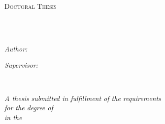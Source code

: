 \documentclass[
12pt, %
singlespacing, %
liststotoc, %
toctotoc, %
nohyperref, %
headsepline, %
]{MastersDoctoralThesis} %
\author{$for(author)$$if(author.correspond)$$author.name$$endif$$endfor$} %
\begin{document}
\frontmatter %

\pagestyle{plain} %


\begin{titlepage}
\begin{center}

\vspace*{.06\textheight}
{\scshape\LARGE \univname\par}\vspace{1.5cm} %
\textsc{\Large Doctoral Thesis}\\[0.5cm] %

\HRule \\[0.4cm] %
{\huge \bfseries \ttitle\par}\vspace{0.4cm} %
\HRule \\[1.5cm] %

\begin{minipage}[t]{0.4\textwidth}
\begin{flushleft} \large
\emph{Author:}\\
\href{$for(author)$$if(author.correspond)$$author.url$$endif$$endfor$}{\authorname} %
\end{flushleft}
\end{minipage}
\begin{minipage}[t]{0.4\textwidth}
\begin{flushright} \large
\emph{Supervisor:} \\
\href{$thesis.supervisor.url$}{\supname} %
\end{flushright}
\end{minipage}\\[3cm]

\vfill

\large \textit{A thesis submitted in fulfillment of the requirements\\ for the degree of \degreename}\\[0.3cm] %
\textit{in the}\\[0.4cm]
\groupname\\\deptname\\[2cm] %


\end{center}
\end{titlepage}
\end{document}
